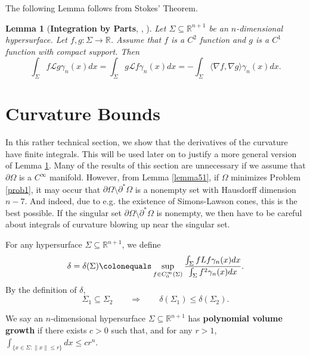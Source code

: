 \documentclass[12pt,reqno]{amsart}
\newtheorem{lemma}[theorem]{Lemma}
\theoremstyle{definition}
\renewcommand{\subset}{\subseteq}
\newcommand{\vnormt}[1]{\left\|#1\right\|}    %
\newcommand{\R}{\mathbb{R}}
\newcommand{\embolden}[1]{\textbf {#1}}
\newcommand{\redA}{\partial^{*}\Omega}
\newcommand{\sdimn}{n}
\newcommand{\adimn}{n+1}
\newcommand{\pcon}{\delta}
\begin{document}
The following Lemma follows from Stokes' Theorem.

\begin{lemma}[\embolden{Integration by Parts}, {\cite[Corollary 3.10]{colding12a}, \cite[Lemma 5.4]{zhu16}}]\label{lemma39.7}
Let $\Sigma\subset\R^{\adimn}$ be an $\sdimn$-dimensional hypersurface.  Let $f,g\colon\Sigma\to\R$.  Assume that $f$ is a $C^{2}$ function and $g$ is a $C^{1}$ function with compact support.  Then
$$\int_{\Sigma}f\mathcal{L}g\gamma_{\sdimn}(x)dx=\int_{\Sigma}g\mathcal{L}f\gamma_{\sdimn}(x)dx=-\int_{\Sigma}\langle\nabla f,\nabla g\rangle\gamma_{\sdimn}(x)dx.$$
\end{lemma}


\section{Curvature Bounds}\label{seccurv}

In this rather technical section, we show that the derivatives of the curvature have finite integrals.  This will be used later on to justify a more general version of Lemma \ref{lemma39.7}.  Many of the results of this section are unnecessary if we assume that $\partial\Omega$ is a $C^{\infty}$ manifold.  However, from Lemma \ref{lemma51}, if $\Omega$ minimizes Problem \ref{prob1}, it may occur that $\partial\Omega\setminus\redA$ is a nonempty set with Hausdorff dimension $\sdimn-7$.  And indeed, due to e.g. the existence of Simons-Lawson cones, this is the best possible.  If the singular set $\partial\Omega\setminus\redA$ is nonempty, we then have to be careful about integrals of curvature blowing up near the singular set.

For any hypersurface $\Sigma\subset\R^{\adimn}$, we define
\begin{equation}\label{seven0}
\pcon=\pcon(\Sigma)
\colonequals\sup_{f\in C_{0}^{\infty}(\Sigma)}\frac{\int_{\Sigma}fLf\gamma_{\sdimn}(x)dx}{\int_{\Sigma}f^{2}\gamma_{\sdimn}(x)dx}.
\end{equation}
By the definition of $\pcon$,
\begin{equation}\label{seven1}
\Sigma_{1}\subset\Sigma_{2}\qquad\Longrightarrow\qquad\pcon(\Sigma_{1})\leq\pcon(\Sigma_{2}).
\end{equation}

We say an $\sdimn$-dimensional hypersurface $\Sigma\subset\R^{\adimn}$ has \embolden{polynomial volume growth} if there exists $c>0$ such that, and for any $r>1$, $\int_{\{x\in\Sigma\colon \vnormt{x}\leq r\}}dx\leq c r^{\sdimn}$.
\end{document}
